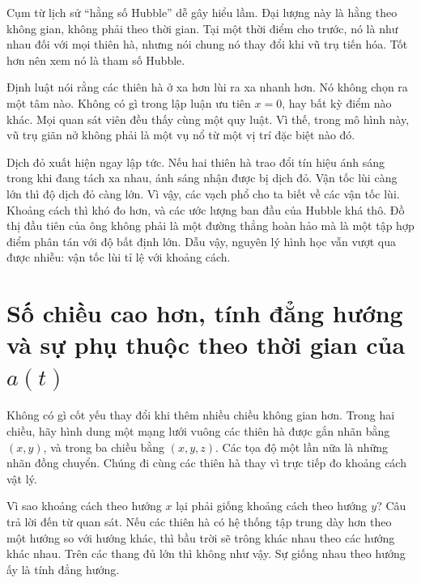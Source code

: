 Cụm từ lịch sử ``hằng số Hubble'' dễ gây hiểu lầm. Đại lượng này là hằng theo không gian, không phải theo thời gian. Tại một thời điểm cho trước, nó là như nhau đối với mọi thiên hà, nhưng nói chung nó thay đổi khi vũ trụ tiến hóa. Tốt hơn nên xem nó là tham số Hubble.

Định luật nói rằng các thiên hà ở xa hơn lùi ra xa nhanh hơn. Nó không chọn ra một tâm nào. Không có gì trong lập luận ưu tiên \(x=0\), hay bất kỳ điểm nào khác. Mọi quan sát viên đều thấy cùng một quy luật. Vì thế, trong mô hình này, vũ trụ giãn nở không phải là một vụ nổ từ một vị trí đặc biệt nào đó.

Dịch đỏ xuất hiện ngay lập tức. Nếu hai thiên hà trao đổi tín hiệu ánh sáng trong khi đang tách xa nhau, ánh sáng nhận được bị dịch đỏ. Vận tốc lùi càng lớn thì độ dịch đỏ càng lớn. Vì vậy, các vạch phổ cho ta biết về các vận tốc lùi. Khoảng cách thì khó đo hơn, và các ước lượng ban đầu của Hubble khá thô. Đồ thị đầu tiên của ông không phải là một đường thẳng hoàn hảo mà là một tập hợp điểm phân tán với độ bất định lớn. Dẫu vậy, nguyên lý hình học vẫn vượt qua được nhiễu: vận tốc lùi tỉ lệ với khoảng cách.

\begin{classroomqa}
\end{classroomqa}

\section{Số chiều cao hơn, tính đẳng hướng và sự phụ thuộc theo thời gian của \(a(t)\)}

Không có gì cốt yếu thay đổi khi thêm nhiều chiều không gian hơn. Trong hai chiều, hãy hình dung một mạng lưới vuông các thiên hà được gắn nhãn bằng \((x,y)\), và trong ba chiều bằng \((x,y,z)\). Các tọa độ một lần nữa là những nhãn đồng chuyển. Chúng đi cùng các thiên hà thay vì trực tiếp đo khoảng cách vật lý.

Vì sao khoảng cách theo hướng \(x\) lại phải giống khoảng cách theo hướng \(y\)? Câu trả lời đến từ quan sát. Nếu các thiên hà có hệ thống tập trung dày hơn theo một hướng so với hướng khác, thì bầu trời sẽ trông khác nhau theo các hướng khác nhau. Trên các thang đủ lớn thì không như vậy. Sự giống nhau theo hướng ấy là tính đẳng hướng.


